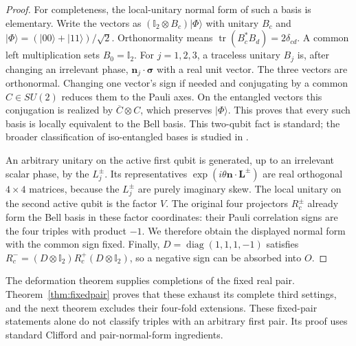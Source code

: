 \documentclass[11pt]{article}
\newcommand{\id}{\mathbb I}
\begin{document}
\begin{proof}
For completeness, the local-unitary normal form of such a basis is
elementary. Write the vectors as
$(\id_2\otimes B_c)|\Phi\rangle$ with unitary $B_c$ and
$|\Phi\rangle=(|00\rangle+|11\rangle)/\sqrt2$.
Orthonormality means $\operatorname{tr}(B_c^*B_d)=2\delta_{cd}$.
A common left multiplication sets $B_0=\id_2$. For $j=1,2,3$, a
traceless unitary $B_j$ is, after changing an irrelevant phase,
$\boldsymbol n_j\cdot\boldsymbol\sigma$ with a real unit vector.
The three vectors are orthonormal. Changing one vector's sign if needed
and conjugating by a common $C\in SU(2)$ reduces them to the Pauli
axes. On the entangled vectors this conjugation is realized by
$\overline C\otimes C$, which preserves $|\Phi\rangle$.
This proves that every such basis is locally equivalent to the Bell basis.
This two-qubit fact is standard; the broader classification of
iso-entangled bases is studied in \cite{DS}.

An arbitrary unitary on the active first qubit is generated, up to an
irrelevant scalar phase, by the $L_j^{\pm}$. Its representatives
$\exp(i\theta\boldsymbol n\cdot\boldsymbol L^{\pm})$ are real
orthogonal $4\times4$ matrices, because the $L_j^{\pm}$ are purely
imaginary skew. The local unitary on the second active qubit is the
factor $V$. The original four projectors $R_c^{\pm}$ already form
the Bell basis in these factor coordinates: their Pauli correlation
signs are the four triples with product $-1$. We therefore obtain
the displayed normal form with the common sign fixed. Finally,
$D=\operatorname{diag}(1,1,1,-1)$ satisfies
$R_c^-=(D\otimes\id_2)R_c^+(D\otimes\id_2)$, so a negative sign
can be absorbed into $O$.
\end{proof}

The deformation theorem supplies completions of the fixed real pair.
Theorem~\ref{thm:fixedpair} proves that these exhaust its complete third
settings, and the next theorem excludes their four-fold extensions.
These fixed-pair statements alone do not classify triples with an
arbitrary first pair.
Its proof uses standard Clifford and pair-normal-form ingredients.
\end{document}
